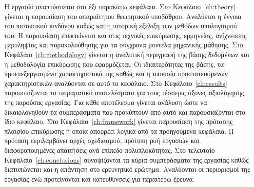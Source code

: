 Η εργασία αναπτύσσεται στα έξι παρακάτω κεφάλαια.
Στο Κεφάλαιο~\ref{ch:theory} γίνεται η παρουσίαση του απαραίτητου θεωρητικού
υποβάθρου. Αναλύεται η έννοια του πιστωτικού κινδύνου καθώς και η ιστορική
εξέλιξη των μεθόδων υπολογισμού του. Η παρουσίαση επεκτείνεται και στις
τεχνικές επικύρωσης, ερμηνείας, ανίχνευσης μεροληψίας και παρακολούθησης για
τα σύγχρονα μοντέλα μηχανικής μάθησης.
Στο Κεφάλαιο~\ref{ch:methodology} γίνεται η αναλυτική περιγραφή της βάσης
δεδομένων και η μεθοδολογία επικύρωσης που εφαρμόζεται. Οι ιδιαιτερότητες
της βάσης, τα προεπεξεργασμένα χαρακτηριστικά της καθώς και η απουσία
προστατευόμενων χαρακτηριστικών αναλύονται σε αυτό το κεφάλαιο.
Στο Κεφάλαιο~\ref{ch:results} παρουσιάζονται τα πειραματικά αποτελέσματα για
τους τέσσερις άξονες αξιολόγησης της παρούσας εργασίας. Για κάθε αποτέλεσμα
γίνεται ανάλυση ώστε να δικαιολογηθούν τα συμπεράσματα που προκύπτουν από
αυτό και παρουσιάζονται στο ίδιο κεφάλαιο.
Στο Κεφάλαιο~\ref{ch:framework} γίνεται παρουσίαση της πρότασης πλαισίου
επικύρωσης η οποία απορρέει λογικά από τα προηγούμενα κεφάλαια. Η πρόταση
περιλαμβάνει αρχές σχεδιασμού, πρότυπη ροή εργασιών και διαφοροποιημένες
απαιτήσεις ανά επίπεδο πολυπλοκότητας.
Στο τελευταίο Κεφάλαιο~\ref{ch:conclusions} συνοψίζονται τα κύρια συμπεράσματα
της εργασίας καθώς διατυπώνεται και η απάντηση στο ερευνητικό ερώτημα.
Αναλύονται οι περιορισμοί της εργασίας ενώ προτείνονται και κατευθύνσεις για
περαιτέρω έρευνα.